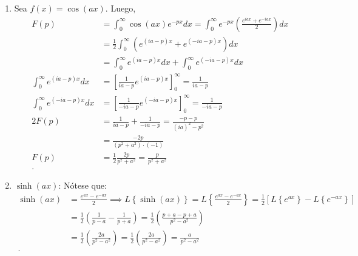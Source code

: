 \documentclass[12pt]{exam}
\begin{document}
\begin{enumerate}
\begin{enumerate}
  \item Sea $f\left( x \right) = \cos\left( ax \right) $. Luego,
    \begin{align*}
      F\left( p \right) &= \int_{0}^{\infty}\cos\left( ax \right) e^{-px}dx = \int_{0}^{\infty}e^{-px}\left( \frac{e^{iax} + e^{-iax}}{2} \right) dx\\
      &= \frac{1}{2}\int_{0}^{\infty}\left( e^{(ia - p)x}+ e^{(-ia - p)x} \right) dx\\
      &= \int_{0}^{\infty} e^{(ia - p)x}dx + \int_{0}^{\infty} e^{(-ia - p)x}dx\\
      \int_{0}^{\infty}e^{\left( ia - p \right) x}dx &= \left[ \frac{1}{ia - p}e^{(ia - p)x} \right]_{0}^{\infty} = \frac{1}{ia - p}\\
      \int_{0}^{\infty} e^{(-ia - p)x}dx &= \left[ \frac{1}{-ia-p}e^{(-ia - p)x} \right]_{0}^{\infty} = \frac{1}{-ia - p}  \\
      2F\left( p \right) &= \frac{1}{ia - p} + \frac{1}{-ia - p} = \frac{-p -p}{\left( ia \right)^2 - p^2}\\
      &= \frac{-2 p}{\left( p^2 + a^2 \right)\cdot \left( -1 \right) } \\
      F\left( p \right) &= \frac{1}{2}\frac{2p}{p^2 + a^2} = \frac{p}{p^2 + a^2} \\
    .\end{align*}
  \item $\sinh\left( ax \right) $:
    Nótese que: 
    \begin{align*}
      \sinh\left( ax \right)  &= \frac{e^{ax} - e^{-ax}}{2} \implies L\left\{ \sinh\left( ax \right)  \right\} = L\left\{ \frac{e^{ax}- e^{-ax}}{2} \right\}  = \frac{1}{2}\left[ L\left\{ e^{ax} \right\} - L\left\{ e^{-ax} \right\}  \right] \\
      &= \frac{1}{2}\left( \frac{1}{p - a} - \frac{1}{p + a} \right) = \frac{1}{2}\left( \frac{p + a - p + a}{p^2 - a^2} \right) \\ 
      &= \frac{1}{2}\left( \frac{2a}{p^2 - a^2} \right) = \frac{1}{2}\left( \frac{2a}{p^2 - a^2} \right) = \frac{a}{p^2 - a^2}  \\
    .\end{align*}


\end{enumerate}
\end{enumerate}
\end{document}
